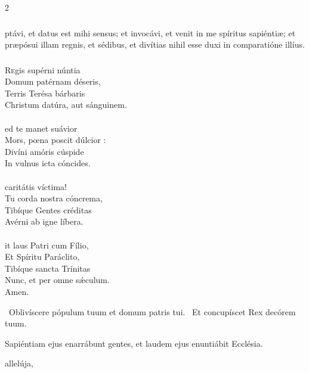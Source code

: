 \documentclass[9pt,twoside]{extarticle}
\begin{document}
\begin{multicols}{2}
{{\subsubsection*{}
ptávi, et datus est mihi sensus; et invocávi, et venit in me spíritus sapiéntiæ; et præpósui illam regnis, et sédibus, et divítias nihil esse duxi in comparatióne illíus.

\subsubsection*{\center {}}
\begin{center}\end{center}
\lettrine{R}egis supérni núntia\\
Domum patérnam déseris,\\
Terris Terésa bárbaris\\
Christum datúra, aut sánguinem.\\
\\
ed te manet suávior\\
Mors, pœna poscit dúlcior :\\
Divíni amóris cúspide\\
In vulnus icta cóncides.\\
\\
 caritátis víctima!\\
Tu corda nostra cóncrema,\\
Tibíque Gentes créditas\\
Avérni ab igne líbera.\\
\\
it laus Patri cum Fílio,\\
Et Spíritu Paráclito,\\
Tibíque sancta Trínitas\\
Nunc, et per omne sǽculum.\\
Amen.

\begin{tightlist}{}
\item {}~Oblivíscere pópulum tuum et domum patris tui. ~Et concupíscet Rex decórem tuum.
\item {} Sapiéntiam ejus enarrábunt gentes, et laudem ejus enuntiábit Ecclésia.
\item {} allelúja, 
\end{tightlist}

}}
\end{multicols}
\end{document}
